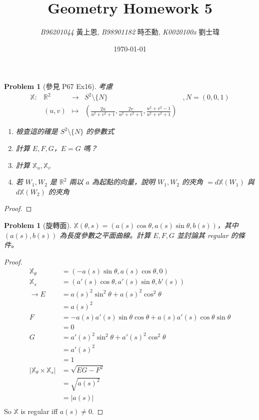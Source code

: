\documentclass[10pt,a4paper]{article}
\newcommand{\LiHei}{\CJKfamily{lh}}
\newcounter{theProblemCounter}
\newtheorem{problem}[theProblemCounter]{Problem}
\begin{document}
\title{{Geometry Homework 5}}
\author{{\it{B96201044}} {\LiHei 黃上恩}, {\it{B98901182}} {\LiHei 時丕勳}, {\it{K0020100x}} {\LiHei 劉士瑋}}
\date{\today}
\maketitle

\newcommand{\bx}{\mathbb{X}}
\setcounter{theProblemCounter}{0}
\begin{problem}[參見 P67 Ex16]
考慮
\[
\begin{array}{ccccc}
\bx: & \mathbb{R}^2 & \to & S^2\setminus \{N\} & , N=(0,0,1) \\
& (u, v) & \mapsto & \left(\frac{2u}{u^2+v^2+1}, \frac{2v}{u^2+v^2+1},\frac{u^2+v^2-1}{u^2+v^2+1}\right) &
\end{array}
\]

\begin{enumerate}
\item[(a)] 檢查這的確是 $S^2\setminus \{N\}$ 的參數式
\item[(b)] 計算 $E, F, G$，$E=G$ 嗎？
\item[(c)] 計算 $\bx_u, \bx_v$
\item[(d)] 若 $W_1, W_2$ 是 $\mathbb{R}^2$ 兩以 $a$ 為起點的向量，說明 $W_1, W_2$ 的夾角 $=d\bx(W_1)$ 與 $d\bx(W_2)$ 的夾角
\end{enumerate}
\end{problem}
\begin{proof}
\end{proof}

\setcounter{theProblemCounter}{1}
\begin{problem}[旋轉面]
$\bx(\theta, s)=(a(s)\cos\theta, a(s)\sin\theta, b(s))$，其中 $(a(s), b(s))$ 為長度參數之平面曲線。計算 $E, F, G$ 並討論其 regular 的條件。
\end{problem}
\begin{proof}
\begin{align*}
\bx_{\theta}&=(-a(s)\sin\theta, a(s)\cos\theta,0)\\
\bx_{s}&=(a'(s)\cos\theta, a'(s)\sin\theta, b'(s))\\
\rightarrow E&=a(s)^2\sin^2\theta+a(s)^2\cos^2\theta\\
&=a(s)^2\\
F&=-a(s)a'(s)\sin\theta\cos\theta+a(s)a'(s)\cos\theta\sin\theta\\
&=0\\
G&=a'(s)^2\sin^2\theta+a'(s)^2\cos^2\theta\\
&=a'(s)^2\\
&=1\\
\left|\bx_{\theta}\times\bx_{s}\right|&=\sqrt{EG-F^2}\\
&=\sqrt{a(s)^2}\\
&=\left|a(s)\right|\\
\end{align*}
So $\bx$ is regular iff $a(s)\neq 0$.
\end{proof}
\end{document}

